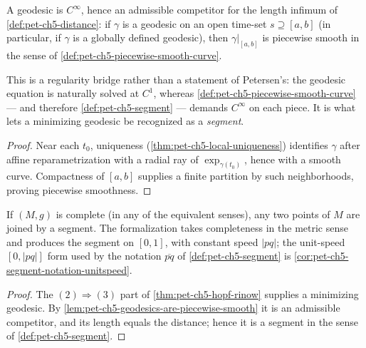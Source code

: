 \begin{lemma}
  \label{lem:pet-ch5-geodesics-are-piecewise-smooth}
  \leanok
  A geodesic is $C^\infty$, hence an admissible competitor for the length
  infimum of \cref{def:pet-ch5-distance}: if $\gamma$ is a geodesic on an open
  time-set $s\supseteq[a,b]$ (in particular, if $\gamma$ is a globally defined
  geodesic), then $\gamma|_{[a,b]}$ is piecewise smooth in the sense of
  \cref{def:pet-ch5-piecewise-smooth-curve}.

  This is a regularity bridge rather than a statement of Petersen's: the geodesic
  equation is naturally solved at $C^1$, whereas
  \cref{def:pet-ch5-piecewise-smooth-curve} — and therefore
  \cref{def:pet-ch5-segment} — demands $C^\infty$ on each piece. It is what lets
  a minimizing geodesic be recognized as a \emph{segment}.
\end{lemma}
\begin{proof}
  \leanok
  \sketch
  Near each $t_0$, uniqueness
  (\cref{thm:pet-ch5-local-uniqueness}) identifies $\gamma$ after affine
  reparametrization with a radial ray of $\exp_{\gamma(t_0)}$, hence with a smooth
  curve.  Compactness of $[a,b]$ supplies a finite partition by such neighborhoods,
  proving piecewise smoothness.
\end{proof}

\begin{corollary}
  \label{cor:pet-ch5-complete-segment-exists}
  \leanok
  If $(M,g)$ is complete (in any of the equivalent senses), any two points of $M$
  are joined by a segment.  The formalization takes completeness in the metric
  sense and produces the segment on $[0,1]$, with constant speed $|pq|$; the
  unit-speed $[0,|pq|]$ form used by the notation $\overline{pq}$ of
  \cref{def:pet-ch5-segment} is \cref{cor:pet-ch5-segment-notation-unitspeed}.
\end{corollary}
\begin{proof}
  \leanok
  \sketch
  The $(2)\Rightarrow(3)$ part of \cref{thm:pet-ch5-hopf-rinow} supplies a
  minimizing geodesic.  By \cref{lem:pet-ch5-geodesics-are-piecewise-smooth} it is
  an admissible competitor, and its length equals the distance; hence it is a
  segment in the sense of \cref{def:pet-ch5-segment}.
\end{proof}

